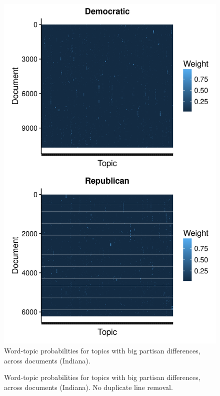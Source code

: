 \documentclass[11pt]{article}
\begin{document}
\begin{figure}[!ht]
	\centering %
	\caption{Word-topic probabilities for topics with big partisan differences, across documents (Indiana).}
	\label{heatmaps_weights}
	\includegraphics[width=\linewidth]{figures/heatmaps_weights_IN.png}
\end{figure}

\begin{figure}[!ht]
	\centering %
	\caption{Word-topic probabilities for topics with big partisan differences, across documents (Indiana). No duplicate line removal.}
	\label{heatmaps_weights}
\end{figure}
\end{document}
